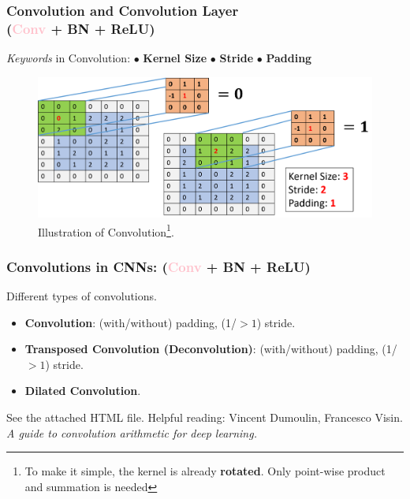 \documentclass[10pt]{beamer}
\begin{document}
\begin{frame}
	\frametitle{Convolution and Convolution Layer \\(\textcolor{pink}{\textbf{Conv}} + BN + ReLU)}
	\textit{Keywords} in Convolution: $\bullet$ \textbf{Kernel Size} \quad $\bullet$ \textbf{Stride} \quad $\bullet$ \textbf{Padding} 
	\begin{figure}[H]
	\centerline{
		\includegraphics[width=1.0\textwidth]{convolution.png}
	}
	\caption{Illustration of Convolution\footnote{To make it simple, the kernel is already \textbf{rotated}. Only point-wise product and summation is needed}.}
	\end{figure}	
\end{frame}

\begin{frame}
	\frametitle{Convolutions in CNNs: (\textcolor{pink}{\textbf{Conv}} + BN + ReLU)}
	Different types of convolutions. 
	\begin{itemize}
		\item \textbf{Convolution}: (with/without) padding, (1/$>1$) stride.
		\item \textbf{Transposed  Convolution (Deconvolution)}: (with/without) padding, (1/$>1$) stride.
		\item \textbf{Dilated Convolution}.
	\end{itemize}
	\vskip 0.2in
	See the attached HTML file. 
	\vskip 0.2in
	Helpful reading: \textcolor{mycite2}{Vincent Dumoulin, Francesco Visin.} \textit{A guide to convolution arithmetic for deep learning. }
\end{frame}
\end{document}
